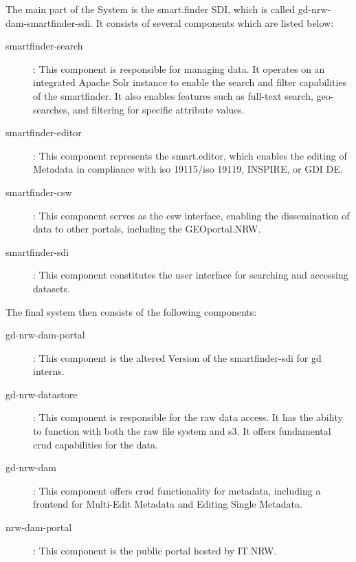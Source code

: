 \documentclass[11pt, titlepage, a4paper]{article}
\begin{document}
The main part of the System is the smart.finder SDI, which is called gd-nrw-dam-smartfinder-sdi. It consists of several components which are listed below:
\begin{description}
    \item[smartfinder-search]: This component is responsible for managing data. It operates on an integrated Apache Solr instance to enable the search and filter capabilities of the smartfinder. It also enables features such as full-text search, geo-searches, and filtering for specific attribute values.
    \item[smartfinder-editor]: This component represents the smart.editor, which enables the editing of Metadata in compliance with \gls{iso} 19115/\gls{iso} 19119, INSPIRE, or GDI DE.
    \item[smartfinder-csw]: This component serves as the \gls{csw} interface, enabling the dissemination of data to other portals, including the GEOportal.NRW.
    \item[smartfinder-sdi]: This component constitutes the user interface for searching and accessing datasets.

\end{description}
The final system then consists of the following components:
\begin{description}
    \item[gd-nrw-dam-portal]: This component is the altered Version of the smartfinder-sdi for \gls{gd} interns.
    \item[gd-nrw-datastore]: This component is responsible for the raw data access. It has the ability to function with both the raw file system and \gls{s3}. It offers fundamental \gls{crud} capabilities for the data.
    \item[gd-nrw-dam]:  This component offers \gls{crud} functionality for metadata, including a frontend for Multi-Edit Metadata and Editing Single Metadata. %
    \item[nrw-dam-portal]: This component is the public portal hosted by IT.NRW.

\end{description}
\end{document}
